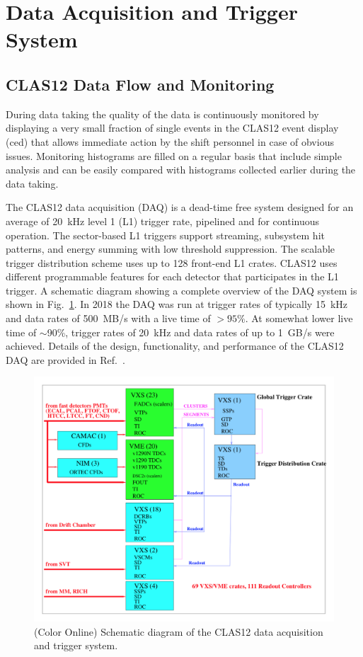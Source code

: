 \documentclass[final,3p,twocolumn]{elsarticle}
\begin{document}
\section{Data Acquisition and Trigger System} 

\subsection {CLAS12 Data Flow and Monitoring} 

During data taking the quality of the data is continuously monitored by displaying a very small fraction of single
events in the CLAS12 event display (ced) that allows immediate action by the shift personnel in case of obvious
issues. Monitoring histograms are filled on a regular basis that include simple analysis and can be easily compared
with histograms collected earlier during the data taking.  

The CLAS12 data acquisition (DAQ) is a dead-time free system designed for an average of 20~kHz level 1 (L1) 
trigger rate, pipelined and for continuous operation. The sector-based  L1 triggers support streaming, subsystem
hit patterns, and energy summing with low threshold suppression.  The scalable trigger distribution scheme uses up
to 128 front-end L1 crates. CLAS12 uses different programmable features for each detector that participates in
the L1 trigger. A schematic diagram showing a complete overview of the DAQ system is shown in Fig.~\ref{daq}. In
2018 the DAQ was run at trigger rates of typically 15~kHz and data rates of 500~MB/s with a live time of $> 95\%$.
At somewhat lower live time of $\sim$90\%, trigger rates of 20~kHz and data rates of up to 1~GB/s were achieved.
Details of the design, functionality, and performance of the CLAS12 DAQ are provided in  Ref.~\cite{DAQ}. 
 
\begin{figure}[htbp!]
\centerline{\includegraphics[width=1.0\columnwidth]{clas12-daq.png}}
\caption{(Color Online) Schematic diagram of the CLAS12 data acquisition and trigger system.}
\label{daq}
\end{figure}
\end{document}
